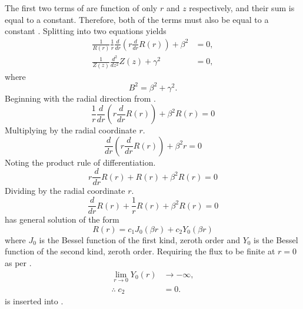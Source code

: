   The first two terms of  are function of only $r$ and
  $z$ respectively, and their sum is equal to a constant. Therefore, both of the
  terms must also be equal to a constant \cite{lamarsh1966}. Splitting
   into two equations yields
  \begin{align}
    \label{eq:finite_cyl_radial_direction}
    \frac{1}{R(r)} \frac{1}{r} \frac{d}{dr} \left( r \frac{d}{dr} R(r) \right) +
      \beta^2 &= 0, \\
    \label{eq:finite_cyl_zeq}
    \frac{1}{Z(z)} \frac{d^2}{dz^2} Z(z) + \gamma^2 &= 0,
  \end{align}
  where
  \begin{equation}
    \label{eq:finite_cyl_b2_sum}
    B^2 = \beta^2 + \gamma^2.
  \end{equation}
  Beginning with the radial direction from
  .
  \begin{equation}
    \frac{1}{r} \frac{d}{dr} \left( r \frac{d}{dr} R(r) \right) + \beta^2 R(r) =
    0
  \end{equation}
  Multiplying by the radial coordinate $r$.
  \begin{equation}
    \frac{d}{dr} \left( r \frac{d}{dr} R(r) \right) + \beta^2 r = 0
  \end{equation}
  Noting the product rule of differentiation.
  \begin{equation}
    r \frac{d}{dr} R(r) + R(r) + \beta^2 R(r) = 0
  \end{equation}
  Dividing by the radial coordinate $r$.
  \begin{equation}
    \label{eq:finite_cyl_bessel}
    \frac{d}{dr} R(r) + \frac{1}{r} R(r) + \beta^2 R(r) = 0
  \end{equation}
   has general solution of the form
  \begin{equation}
    \label{eq:finite_cyl_bessel_general}
    R(r) = c_1 J_0(\beta r ) + c_2 Y_0(\beta r)
  \end{equation}
  where $J_0$ is the Bessel function of the first kind, zeroth order and $Y_0$
  is the Bessel function of the second kind, zeroth order. Requiring the flux to
  be finite at $r=0$ as per .
  \begin{align}
    \lim_{r \rightarrow 0} Y_0(r) &\rightarrow - \infty, \\
    \label{eq:finite_cyl_c2}
    \therefore \; c_2 &= 0.
  \end{align}
   is inserted into .
